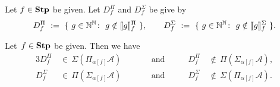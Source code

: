 \begin{dfn}
Let $f\in\mathbf{Stp}$ be given.
Let $D^\Pi_f$
and $D^\Sigma_f$ be give by
\begin{equation*}
D^\Pi_f \ \eqdf \ 
\{\  g\in\N^\N\colon\ g\notin \decode{g}^\Pi_f\ \},
\qquad
D^\Sigma_f \ \eqdf \ 
\{\  g\in\N^\N\colon\ g\notin \decode{g}^\Sigma_f\ \}.
\end{equation*}
\end{dfn}

\begin{thm}
\label{T:borel-hierarchy}
Let~$f\in \mathbf{Stp}$
be given.
Then we have
\begin{alignat*}{3}
D^\Pi_f \,&\in\, \Sigma(\Pi_{\alpha[f]} \mathcal{A})
\qquad&&\text{and}\qquad&
D^\Pi_f \,&\notin\, \Pi(\Sigma_{\alpha[f]} \mathcal{A}),\\
D^\Sigma_f \,&\in\, \Pi(\Sigma_{\alpha[f]} \mathcal{A})
\qquad&&\text{and}\qquad&
D^\Sigma_f \,&\notin\, \Sigma(\Pi_{\alpha[f]} \mathcal{A}).
\end{alignat*}
\end{thm}
